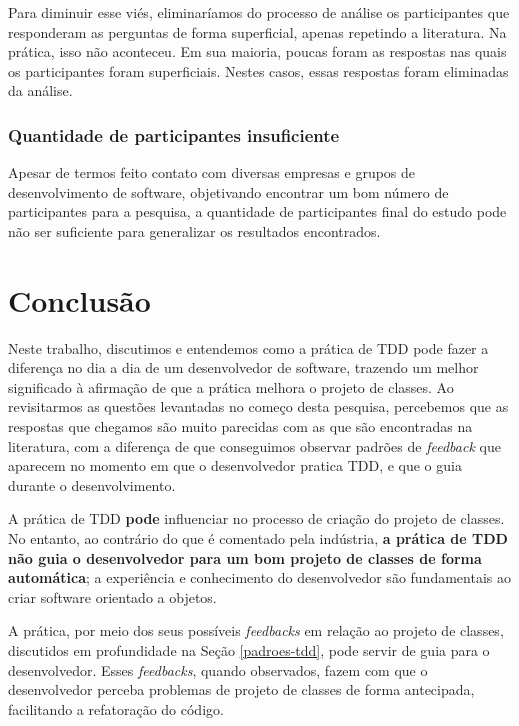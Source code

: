 \documentclass[conference]{IEEEtran}
\begin{document}
Para diminuir esse viés, eliminaríamos do processo de análise os participantes
que responderam as perguntas de forma superficial, apenas repetindo a literatura. Na prática,
isso não aconteceu. Em sua maioria, poucas foram as respostas nas quais os participantes
foram superficiais. Nestes casos, essas respostas foram eliminadas da análise.

\subsubsection{Quantidade de participantes insuficiente}

Apesar de termos feito contato
com diversas empresas e grupos de desenvolvimento de software,
objetivando encontrar um bom número de participantes para a pesquisa,
a quantidade de participantes final do estudo pode não ser suficiente para generalizar
os resultados encontrados. 

\section{Conclusão}

Neste trabalho, discutimos e entendemos como a prática de TDD pode
fazer a diferença no dia a dia de um desenvolvedor de software,
trazendo um melhor significado à afirmação de que a prática melhora o projeto de classes.
Ao revisitarmos as questões levantadas no começo desta pesquisa,
percebemos que as respostas que chegamos são muito parecidas
com as que são encontradas na literatura, com a diferença de 
que conseguimos observar padrões de \textit{feedback} que aparecem
no momento em que o desenvolvedor pratica TDD, e que o guia durante
o desenvolvimento.

A prática de TDD \textbf{pode} influenciar no processo de criação do projeto de classes.
No entanto, ao contrário do que é comentado pela indústria,
\textbf{a prática de TDD não guia o desenvolvedor para um bom projeto de classes
de forma automática}; a experiência e conhecimento 
do desenvolvedor são fundamentais ao criar software orientado a objetos. 

A prática, por meio dos seus possíveis \textit{feedbacks} em relação ao
projeto de classes, discutidos
em profundidade na Seção \ref{padroes-tdd}, pode servir de guia
para o desenvolvedor. Esses \textit{feedbacks}, quando observados, fazem
com que o desenvolvedor perceba problemas de projeto de classes de
forma antecipada, facilitando a refatoração do código.
\end{document}

